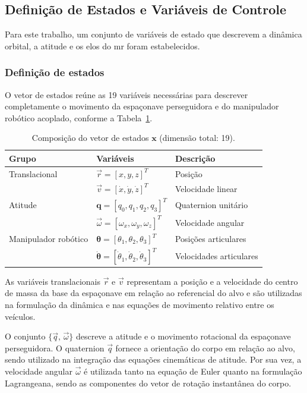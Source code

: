 \subsection{Definição de Estados e Variáveis de Controle}
\label{sec:var_estado_controle}

Para este trabalho, um conjunto de variáveis de estado que descrevem a dinâmica orbital, a atitude e os elos do \gls{mr} foram estabelecidos.

\subsubsection{Definição de estados}
O vetor de estados reúne as 19 variáveis necessárias para descrever completamente o movimento da espaçonave perseguidora e do manipulador robótico acoplado, conforme a Tabela~\ref{tab:vetor_estados}.

\begin{table}[ht]
\centering
\caption{Composição do vetor de estados $\mathbf{x}$ (dimensão total: 19).}
\label{tab:vetor_estados}
\begin{tabular}{lll}
\toprule
\textbf{Grupo} & \textbf{Variáveis} & \textbf{Descrição} \\ 
\midrule
Translacional &
$\vec{r} = [x, y, z]^T$ &
Posição \\[2pt]
 &
$\vec{v} = [\dot{x}, \dot{y}, \dot{z}]^T$ &
Velocidade linear \\[3pt]
Atitude &
$\mathbf{q} = [q_0, q_1, q_2, q_3]^T$ &
Quaternion unitário \\[2pt]
 &
$\vec{\omega} = [\omega_x, \omega_y, \omega_z]^T$ &
Velocidade angular \\[3pt]
Manipulador robótico &
$\boldsymbol{\theta} = [\theta_1, \theta_2, \theta_3]^T$ &
Posições articulares \\[2pt]
 &
$\dot{\boldsymbol{\theta}} = [\dot{\theta}_1, \dot{\theta}_2, \dot{\theta}_3]^T$ &
Velocidades articulares \\[2pt]
\bottomrule
\end{tabular}
\end{table}

As variáveis translacionais $\vec{r}$ e $\vec{v}$ representam a posição e a velocidade do centro de massa da base da espaçonave em relação ao referencial do alvo e são utilizadas na formulação da dinâmica e nas equações de movimento relativo entre os veículos.

O conjunto $\{\vec{q},\,\vec{\omega}\}$ descreve a atitude e o movimento rotacional da espaçonave perseguidora.  
O quaternion $\vec{q}$ fornece a orientação do corpo em relação ao alvo, sendo utilizado na integração das equações cinemáticas de atitude.  
Por sua vez, a velocidade angular $\vec{\omega}$ é utilizada tanto na equação de Euler quanto na formulação Lagrangeana, sendo as componentes do vetor de rotação instantânea do corpo.


